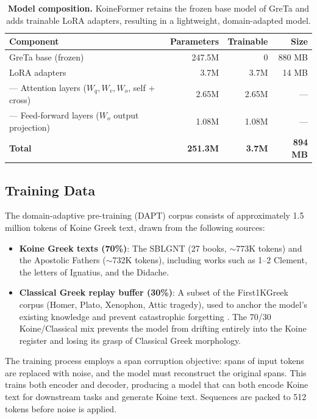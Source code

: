 \documentclass[11pt,letterpaper]{article}
\newcommand{\tblhead}{\rowcolor{marine!12}}
\begin{document}
\begin{table}[H]
\centering
\begin{tabular}{lrrr}
\toprule
\tblhead\textbf{Component} & \textbf{Parameters} & \textbf{Trainable} & \textbf{Size} \\
\midrule
GreTa base (frozen) & 247.5M & 0 & 880 MB \\
LoRA adapters & 3.7M & 3.7M & 14 MB \\
\quad--- Attention layers ($W_{q}, W_{v}, W_{o}$, self + cross) & 2.65M & 2.65M & --- \\
\quad--- Feed-forward layers ($W_{o}$ output projection) & 1.08M & 1.08M & --- \\
\midrule
\rowcolor{papyrus}\textbf{Total} & \textbf{251.3M} & \textbf{3.7M} & \textbf{894 MB} \\
\bottomrule
\end{tabular}
\caption{\textbf{Model composition.} KoineFormer retains the frozen base model of GreTa and adds trainable LoRA adapters, resulting in a lightweight, domain-adapted model.}
\label{tab:model}
\end{table}

\subsection{Training Data}

The domain-adaptive pre-training (DAPT) corpus consists of approximately 1.5 million tokens of Koine Greek text, drawn from the following sources:
\begin{itemize}
    \item \textbf{Koine Greek texts (70\%)}: The SBLGNT \citep{holmes2010} (27 books, $\sim$773K tokens) and the Apostolic Fathers ($\sim$732K tokens), including works such as 1--2 Clement, the letters of Ignatius, and the Didache.
    \item \textbf{Classical Greek replay buffer (30\%)}: A subset of the First1KGreek corpus (Homer, Plato, Xenophon, Attic tragedy), used to anchor the model's existing knowledge and prevent catastrophic forgetting \citep{gururangan2020}. The 70/30 Koine/Classical mix prevents the model from drifting entirely into the Koine register and losing its grasp of Classical Greek morphology.
\end{itemize}

The training process employs a span corruption objective: spans of input tokens are replaced with noise, and the model must reconstruct the original spans. This trains both encoder and decoder, producing a model that can both encode Koine text for downstream tasks and generate Koine text. Sequences are packed to 512 tokens before noise is applied.
\end{document}
